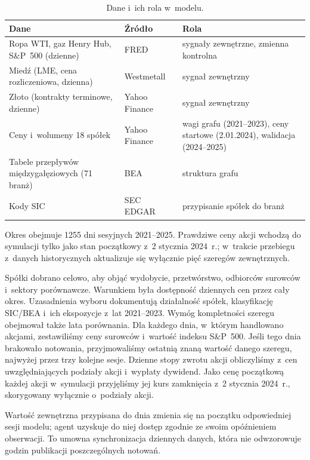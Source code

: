 \documentclass[11pt,a4paper]{article}
\begin{document}
\begin{table}[!htbp]
\centering\small
\caption{Dane i~ich rola w~modelu.}\label{tab:dane}
\begin{tabularx}{\textwidth}{@{}Y l Y@{}}
\toprule
Dane & Źródło & Rola \\
\midrule
Ropa WTI, gaz Henry Hub, S\&P~500 (dzienne) & FRED~\cite{data-fred} & sygnały zewnętrzne, zmienna kontrolna \\ \addlinespace[3pt]
Miedź (LME, cena rozliczeniowa, dzienna) & Westmetall~\cite{data-westmetall} & sygnał zewnętrzny \\ \addlinespace[3pt]
Złoto (kontrakty terminowe, dzienne) & Yahoo Finance~\cite{data-yahoo} & sygnał zewnętrzny \\ \addlinespace[3pt]
Ceny i~wolumeny 18 spółek & Yahoo Finance & wagi grafu (2021--2023), ceny startowe (2.01.2024), walidacja
  (2024--2025) \\ \addlinespace[3pt]
Tabele przepływów międzygałęziowych (71 branż) & BEA~\cite{data-bea} & struktura grafu \\ \addlinespace[3pt]
Kody SIC & SEC EDGAR~\cite{data-edgar} & przypisanie spółek do branż \\

\bottomrule
\end{tabularx}
\end{table}

Okres obejmuje 1255 dni sesyjnych 2021--2025. Prawdziwe ceny akcji wchodzą do symulacji tylko jako stan początkowy
z~2 stycznia 2024~r.; w~trakcie przebiegu z~danych historycznych aktualizuje się wyłącznie pięć szeregów zewnętrznych.

Spółki dobrano celowo, aby objąć wydobycie, przetwórstwo, odbiorców surowców i~sektory porównawcze.
Warunkiem była dostępność dziennych cen przez cały okres. Uzasadnienia wyboru dokumentują działalność spółek,
klasyfikację SIC/BEA i~ich ekspozycje z~lat 2021--2023. Wymóg kompletności szeregu obejmował także lata porównania.
Dla każdego dnia, w~którym handlowano akcjami, zestawiliśmy ceny surowców i~wartość indeksu S\&P~500.
Jeśli tego dnia brakowało notowania, przyjmowaliśmy ostatnią znaną wartość danego szeregu, najwyżej przez trzy kolejne sesje.
Dzienne stopy zwrotu akcji obliczyliśmy z~cen uwzględniających podziały akcji i~wypłaty dywidend.
Jako cenę początkową każdej akcji w~symulacji przyjęliśmy jej kurs zamknięcia z~2 stycznia 2024~r.,
skorygowany wyłącznie o~podziały akcji.

Wartość zewnętrzna przypisana do dnia zmienia się na początku
odpowiedniej sesji modelu; agent uzyskuje do niej dostęp zgodnie ze swoim opóźnieniem obserwacji.
To umowna synchronizacja dziennych danych, która nie odwzorowuje godzin publikacji poszczególnych notowań.
\end{document}
